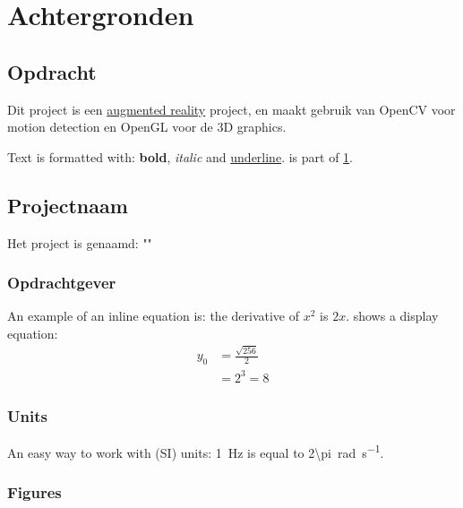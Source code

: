 
\chapter{Achtergronden} \label{cha:your-first-document}

\section{Opdracht} \label{sec:opdracht}

Dit project is een \underline{augmented reality} project, en maakt gebruik van OpenCV voor motion detection en OpenGL voor de 3D graphics.

Text is formatted with: \textbf{bold}, \textit{italic} and \underline{underline}.
 is part of \cref{cha:your-first-document}.

\section{Projectnaam} \label{sec:projectnaam}
Het project is genaamd: "\projectname"


\subsection{Opdrachtgever} \label{subsec:opdrachtgever}

An example of an inline equation is: the derivative of $x^2$ is $2x$.  shows a display equation:
\begin{align} \label{eq:example}
          y_{0} &= \frac{\sqrt{256}}{2} \\
                &= 2^{3} = 8 \nonumber 
\end{align}


\subsection{Units} \label{subsec:units}

An easy way to work with (SI) units: \SI{1}{\hertz} is equal to \SI{2\pi}{\radian\per\second}.


\subsection{Figures} \label{subsec:figures}

